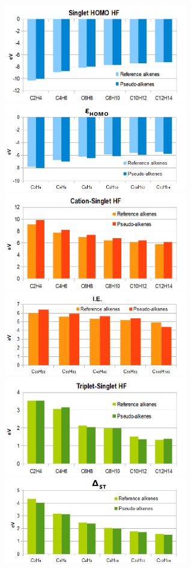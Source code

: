 \documentclass[journal=jctcce,manuscript=article]{achemso}
\begin{document}
\begin{figure}
\includegraphics[width=8cm]{hf_homo}
\includegraphics[width=8cm]{pbe0_homo}
\includegraphics[width=8cm]{hf_ionisation}
\includegraphics[width=8cm]{pbe0_ionisation}
\includegraphics[width=8cm]{hf_excitation}
\includegraphics[width=8cm]{pbe0_excitation}

\end{figure}
\end{document}

